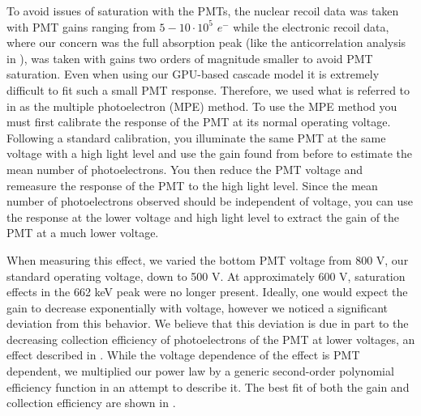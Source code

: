 To avoid issues of saturation with the PMTs, the nuclear recoil data was taken with PMT gains ranging from $5-10 \cdot 10^5 \, \, e^-$ while the electronic recoil data, where our concern was the full absorption peak (like the anticorrelation analysis in ), was taken with gains two orders of magnitude smaller to avoid PMT saturation.  Even when using our GPU-based cascade model it is extremely difficult to fit such a small PMT response.  Therefore, we used what is referred to in  as the multiple photoelectron (MPE) method.  To use the MPE method you must first calibrate the response of the PMT at its normal operating voltage.  Following a standard calibration, you illuminate the same PMT at the same voltage with a high light level and use the gain found from before to estimate the mean number of photoelectrons.  You then reduce the PMT voltage and remeasure the response of the PMT to the high light level.  Since the mean number of photoelectrons observed should be independent of voltage, you can use the response at the lower voltage and high light level to extract the gain of the PMT at a much lower voltage.

When measuring this effect, we varied the bottom PMT voltage from 800 V, our standard operating voltage, down to 500 V.  At approximately 600 V, saturation effects in the 662 keV peak were no longer present.  Ideally, one would expect the gain to decrease exponentially with voltage, however we noticed a significant deviation from this behavior.  We believe that this deviation is due in part to the decreasing collection efficiency of photoelectrons of the PMT at lower voltages, an effect described in .  While the voltage dependence of the effect is PMT dependent, we multiplied our power law by a generic second-order polynomial efficiency function in an attempt to describe it.  The best fit of both the gain and collection efficiency are shown in .

